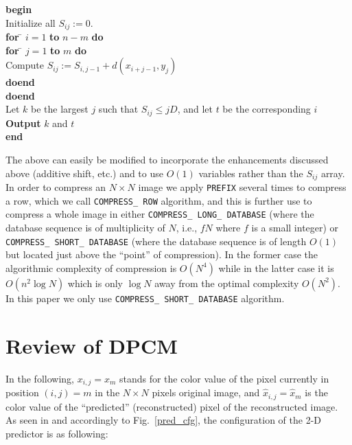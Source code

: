 \documentclass[11pt,a4paper]{article}
\newcommand{\xh}{\hat{x}}
\newcommand{\xm}{x_m}
\newcommand{\xmh}{\hat{x}_m}
\begin{document}
\begin{tabbing}
{\bf begin}\=  \\
         \> Initialize all $S_{ij} := 0$.\\
         \> {\bf for} \= $i=1$ {\bf to} $n-m$ {\bf do} \\
         \> \> {\bf for} \= $j=1$ {\bf to} $m$ {\bf do} \\
         \>  \>  \> Compute $S_{ij} := S_{i,j-1} + d(x_{i+j-1}, y_j)$\\
         \>  \> {\bf doend} \\
         \>  {\bf doend} \\
         \>  Let $k$ be the largest $j$ such that $S_{ij} \leq j D$,
         and let $t$ be the corresponding $i$\\
         \>  {\bf Output} $k$ and $t$\\
{\bf end}
\end{tabbing}

The above can easily be modified to incorporate the enhancements
discussed above (additive shift, etc.) and to use $O(1)$ variables
rather than the $S_{ij}$ array.\\


In order to compress an $N\times N$ image we apply {\tt PREFIX} several
times to compress a row, which we call {\tt COMPRESS\_\,ROW} algorithm,
and this is further use to compress a whole image in either
{\tt COMPRESS\_\,LONG\_\,DATABASE} (where the database sequence is of
multiplicity of $N$, i.e., $f N$ where $f$ is a small integer)
or {\tt COMPRESS\_\,SHORT\_\,DATABASE} (where the database sequence is
of length $O(1)$ but located just above the ``point'' of compression). 
In the former case the algorithmic complexity of
compression is $O(N^4)$ while in the latter case it is $O(n^2\log N)$ which
is only $\log N$ away from the optimal complexity $O(N^2)$. 
In this paper we only use {\tt COMPRESS\_\,SHORT\_\,DATABASE} algorithm.

\section{Review of DPCM}

In the following, $x_{i,j} = \xm$ stands for the color value of the pixel
currently in position $(i,j) = m$ in the $N\times N$ pixels original
image, and $\xh_{i,j} = \xmh$ is the color value of the ``predicted''
(reconstructed) pixel of the reconstructed image. As seen in \cite{rj}
and accordingly to Fig.~\ref{pred_cfg}, the configuration of the 2-D
predictor is as following:
\end{document}
